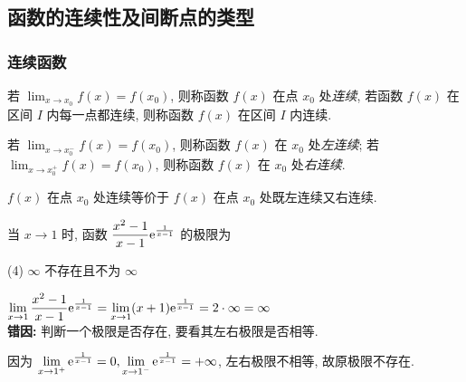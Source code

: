 \subsection{函数的连续性及间断点的类型}

\subsubsection{连续函数}

\begin{definition}[函数连续]
    若 $\displaystyle\lim_{x\to x_0}f(x)=f(x_0)$, 则称函数 $f(x)$ 在点 $x_0$ 处\textit{连续}, 若函数 $f(x)$ 在区间 $ I $ 内每一点都连续, 则称函数 $f(x)$ 在区间 $I$ 内连续.
\end{definition}

\begin{definition}[单侧连续]
    若 $\displaystyle\lim_{x\to x_0^-}f(x)=f(x_0)$, 则称函数 $f(x)$ 在 $x_0$ 处\textit{左连续}; 若 $\displaystyle\lim_{x\to x_0^+}f(x)=f(x_0)$, 则称函数 $f(x)$ 在 $x_0$ 处\textit{右连续}.
    \label{unilateral continuous}
\end{definition}

\begin{theorem}[函数连续的充要条件]
    $f(x)$ 在点 $x_0$ 处连续等价于 $f(x)$  在点 $x_0$ 处既左连续又右连续.
\end{theorem}

\begin{example}
    当 $x\to1$ 时, 函数 $\dfrac{x^2-1}{x-1}\mathrm{e} ^{\frac{1}{x-1}}$ 的极限为 
    \begin{tasks}(4)
        \task $\infty$
        \task 不存在且不为 $\infty$
    \end{tasks}
\end{example}
\begin{errorSolution}
    $ \displaystyle \lim_{x \to 1}\dfrac{x^2-1}{x-1}\mathrm{e} ^{\frac{1}{x-1}}=\lim_{x \to 1}(x+1)\mathrm{e} ^{\frac{1}{x-1}} =2\cdot \infty=\infty$\\ 
    \textbf{错因: }判断一个极限是否存在, 要看其左右极限是否相等.\\
\end{errorSolution}
\begin{solution}
    因为 $\displaystyle \lim_{x \to 1^{+}}\mathrm{e} ^{\frac{1}{x-1}}=0, \lim_{x \to 1^{-}}\mathrm{e} ^{\frac{1}{x-1}}=+\infty$, 左右极限不相等, 故原极限不存在.
\end{solution}

